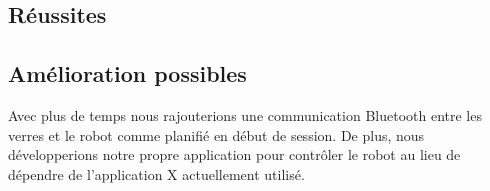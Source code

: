 

\subsection{Réussites}



\subsection{Amélioration possibles}

Avec plus de temps nous rajouterions une communication Bluetooth entre les verres et le robot comme planifié en début de session.
De plus, nous développerions notre propre application pour contrôler le robot au lieu de dépendre de l’application X actuellement utilisé.
